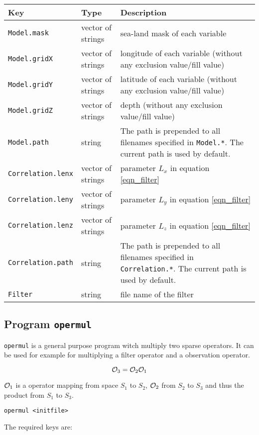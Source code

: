 \documentclass[a4paper,12pt]{article}
\newcommand{\code}{\texttt}
\newenvironment{keytabular}{\begin{tabular}{|p{0.3\textwidth}|p{0.2\textwidth}|p{0.5\textwidth}|} \hline Key & Type & Description \\ \hline \hline }{\end{tabular}}
\begin{document}
\begin{keytabular}
\code{Model.mask} & vector of strings &  sea-land mask of each variable 
\\
\code{Model.gridX} & vector of strings & longitude of each variable (without any exclusion value/fill value)
\\
\code{Model.gridY} & vector of strings & latitude of each variable (without any exclusion value/fill value)
\\
\code{Model.gridZ} & vector of strings & depth (without any exclusion value/fill value)
\\
\code{Model.path} & string & The path is prepended to all filenames
specified in \code{Model.*}. The current path is used by default.
\\
\code{Correlation.lenx} & vector of strings & parameter $L_x$ in equation \ref{eqn_filter}
\\
\code{Correlation.leny} & vector of strings & parameter $L_y$ in equation \ref{eqn_filter}
\\
\code{Correlation.lenz} & vector of strings & parameter $L_z$ in equation \ref{eqn_filter}
\\
\code{Correlation.path} & string & The path is prepended to all filenames
specified in \code{Correlation.*}. The current path is used by default.
\\
\code{Filter} & string & file name of the filter
\\
\hline
\end{keytabular}

\subsection{Program \code{opermul}}

\code{opermul} is a general purpose program witch multiply two sparse operators. It can be used for example for multiplying a filter operator and a observation operator.

\begin{equation}
{\cal O}_3 = {\cal O}_2 {\cal O}_1  
\end{equation}

${\cal O}_1$ is a operator mapping from space $S_1$ to $S_2$, ${\cal O}_2$ from $S_2$ to $S_3$ and thus the product from  $S_1$ to $S_3$.
 
\begin{verbatim}
opermul <initfile>
\end{verbatim}

The required keys are: \\
\end{document}
